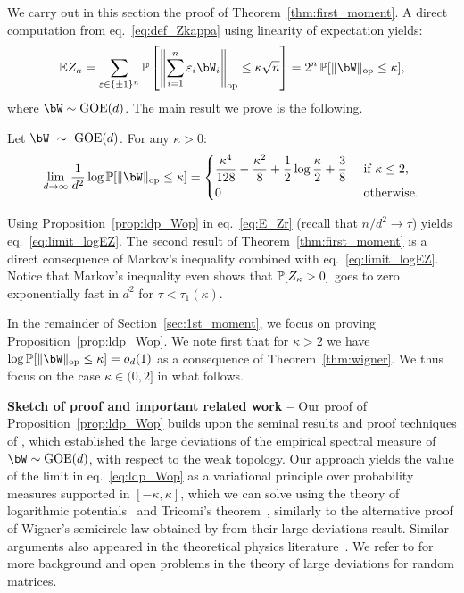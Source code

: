 We carry out in this section the proof of Theorem~\ref{thm:first_moment}.
A direct computation from eq.~\eqref{eq:def_Zkappa} using linearity of expectation yields:
\begin{equation}
    \label{eq:E_Zr}
    \EE Z_\kappa = \sum_{\eps \in \{\pm 1\}^n} \bbP\left[\left\|\sum_{i=1}^n \eps_i \bW_i\right\|_{\op} \leq \kappa \sqrt{n}\right] = 2^n \, \bbP[\|\bW\|_\op \leq \kappa],
\end{equation}
where $\bW \sim \GOE(d)$.
The main result we prove is the following.
\begin{proposition}
    \label{prop:ldp_Wop}
    Let $\bW~\sim~\GOE(d)$. For any $\kappa > 0$:
    \begin{equation}
        \label{eq:ldp_Wop}
        \lim_{d \to \infty} \frac{1}{d^2} \log \bbP[\|\bW\|_\op \leq \kappa]
        = 
        \begin{dcases}
            \frac{\kappa^4}{128} - \frac{\kappa^2}{8} + \frac{1}{2} \log \frac{\kappa}{2} + \frac{3}{8} &\textrm{ if } \kappa \leq 2, \\
            0 &\textrm{ otherwise.} 
        \end{dcases}
    \end{equation}
\end{proposition}
\noindent
Using Proposition~\ref{prop:ldp_Wop} in eq.~\eqref{eq:E_Zr} (recall that $n/d^2 \to \tau$) yields eq.~\eqref{eq:limit_logEZ}.
The second result of Theorem~\ref{thm:first_moment} is a direct consequence of Markov's inequality combined with eq.~\eqref{eq:limit_logEZ}.
Notice that Markov's inequality even shows that $\mathbb{P}[Z_\kappa > 0]$ goes to zero exponentially fast in $d^2$ for $\tau < \tau_1(\kappa)$.

\myskip 
In the remainder of Section~\ref{sec:1st_moment}, we focus on proving Proposition~\ref{prop:ldp_Wop}.
We note first that for $\kappa > 2$ we have $\log \bbP[\|\bW\|_\op \leq \kappa] = \smallO_d(1)$ as a consequence of Theorem~\ref{thm:wigner}. 
We thus focus on the case $\kappa \in (0,2]$ in what follows.

\myskip 
\textbf{Sketch of proof and important related work --}
Our proof of Proposition~\ref{prop:ldp_Wop} builds upon the seminal results and proof techniques of \cite{arous1997large}, which established the large deviations of the 
empirical spectral measure of $\bW \sim \GOE(d)$, with respect to the weak topology.
Our approach yields the value of the limit in eq.~\eqref{eq:ldp_Wop} as a variational principle over probability measures supported in $[-\kappa,\kappa]$, 
which we can solve using the theory of logarithmic potentials~\citep{saff2013logarithmic} and Tricomi's theorem~\citep{tricomi1985integral}, similarly to the alternative proof of Wigner's semicircle law obtained by \cite{arous1997large} from their large deviations result.
Similar arguments also appeared in the theoretical physics literature~\citep{dean2006large,vivo2007large,dean2008extreme,majumdar2014top}. 
We refer to \cite{anderson2010introduction,guionnet2022rare} for more background and open problems in the theory of large deviations for random matrices.

